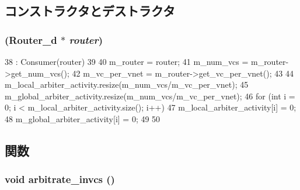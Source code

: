 \subsection{コンストラクタとデストラクタ}
\hypertarget{classVCallocator__d_a46ce1e39ce6dcbf532f3ec6bf6beceb3}{
\subsubsection[{VCallocator\_\-d}]{ ({\bf Router\_\-d} $\ast$ {\em router})}}
\label{classVCallocator__d_a46ce1e39ce6dcbf532f3ec6bf6beceb3}



\begin{DoxyCode}
38     : Consumer(router)
39 {
40     m_router = router;
41     m_num_vcs = m_router->get_num_vcs();
42     m_vc_per_vnet = m_router->get_vc_per_vnet();
43 
44     m_local_arbiter_activity.resize(m_num_vcs/m_vc_per_vnet);
45     m_global_arbiter_activity.resize(m_num_vcs/m_vc_per_vnet);
46     for (int i = 0; i < m_local_arbiter_activity.size(); i++) {
47         m_local_arbiter_activity[i] = 0;
48         m_global_arbiter_activity[i] = 0;
49     }
50 }
\end{DoxyCode}


\subsection{関数}
\hypertarget{classVCallocator__d_a01375ae0acbd600860e255ee14aff73c}{
\subsubsection[{arbitrate\_\-invcs}]{\setlength{\rightskip}{0pt plus 5cm}void arbitrate\_\-invcs ()}}
\label{classVCallocator__d_a01375ae0acbd600860e255ee14aff73c}



